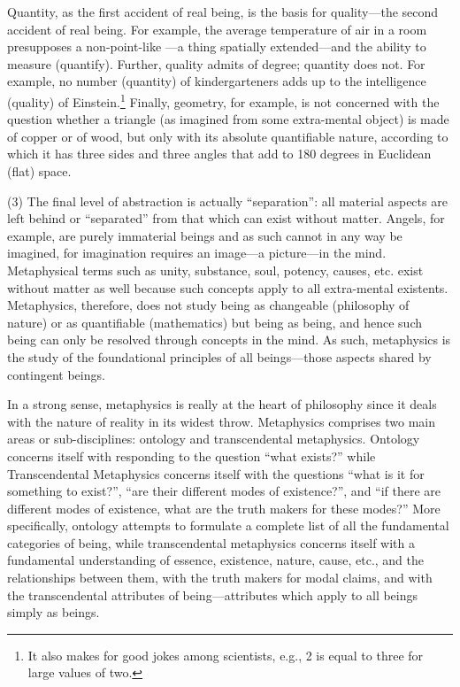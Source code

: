 Quantity, as the first accident of real being, is the basis for quality---the second accident of real being. For example, the average temperature of air in a room presupposes a non-point-like ---a thing spatially extended---and the ability to measure (quantify). Further, quality admits of degree; quantity does not. For example, no number (quantity) of kindergarteners adds up to the intelligence (quality) of Einstein.\footnote{It also makes for good jokes among scientists, e.g., 2 is equal to three for large values of two.} Finally, geometry, for example, is not concerned with the question whether a triangle (as imagined from some extra-mental object) is made of copper or of wood, but only with its absolute quantifiable nature, according to which it has three sides and three angles that add to 180 degrees in Euclidean (flat) space.

(3) The final level of abstraction is actually ``separation'': all material aspects are left behind or ``separated'' from that which can exist without matter. Angels, for example, are purely immaterial beings and as such cannot in any way be imagined, for imagination requires an image---a picture---in the mind. Metaphysical terms such as unity, substance, soul, potency, causes, etc. exist without matter as well because such concepts apply to all extra-mental existents. Metaphysics, therefore, does not study being as changeable (philosophy of nature) or as quantifiable (mathematics) but being as being, and hence such being can only be resolved through concepts in the mind. As such, metaphysics is the study of the foundational principles of all beings---those aspects shared by  contingent beings.

In a strong sense, metaphysics is really at the heart of philosophy since it deals with the nature of reality in its widest throw. Metaphysics comprises two main areas or sub-disciplines: ontology and transcendental metaphysics. Ontology concerns itself with responding to the question ``what exists?'' while Transcendental Metaphysics concerns itself with the questions ``what is it for something to exist?'', ``are their different modes of existence?'', and ``if there are different modes of existence, what are the truth makers for these modes?'' More specifically, ontology attempts to formulate a complete list of all the fundamental categories of being, while transcendental metaphysics concerns itself with a fundamental understanding of essence, existence, nature, cause, etc., and the relationships between them, with the truth makers for modal claims, and with the transcendental attributes of being---attributes which apply to all beings simply as beings.

